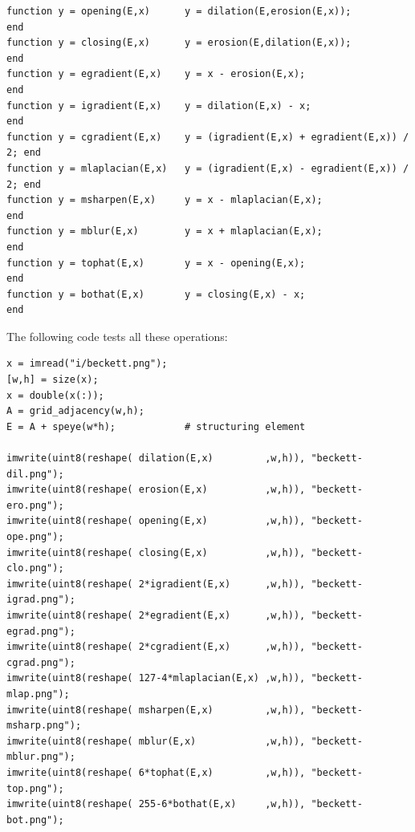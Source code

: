 \begin{verbatim}
function y = opening(E,x)      y = dilation(E,erosion(E,x));              end
function y = closing(E,x)      y = erosion(E,dilation(E,x));              end
function y = egradient(E,x)    y = x - erosion(E,x);                      end
function y = igradient(E,x)    y = dilation(E,x) - x;                     end
function y = cgradient(E,x)    y = (igradient(E,x) + egradient(E,x)) / 2; end
function y = mlaplacian(E,x)   y = (igradient(E,x) - egradient(E,x)) / 2; end
function y = msharpen(E,x)     y = x - mlaplacian(E,x);                   end
function y = mblur(E,x)        y = x + mlaplacian(E,x);                   end
function y = tophat(E,x)       y = x - opening(E,x);                      end
function y = bothat(E,x)       y = closing(E,x) - x;                      end
\end{verbatim}

The following code tests all these operations:

\begin{verbatim}
x = imread("i/beckett.png");
[w,h] = size(x);
x = double(x(:));
A = grid_adjacency(w,h);
E = A + speye(w*h);            # structuring element

imwrite(uint8(reshape( dilation(E,x)         ,w,h)), "beckett-dil.png");
imwrite(uint8(reshape( erosion(E,x)          ,w,h)), "beckett-ero.png");
imwrite(uint8(reshape( opening(E,x)          ,w,h)), "beckett-ope.png");
imwrite(uint8(reshape( closing(E,x)          ,w,h)), "beckett-clo.png");
imwrite(uint8(reshape( 2*igradient(E,x)      ,w,h)), "beckett-igrad.png");
imwrite(uint8(reshape( 2*egradient(E,x)      ,w,h)), "beckett-egrad.png");
imwrite(uint8(reshape( 2*cgradient(E,x)      ,w,h)), "beckett-cgrad.png");
imwrite(uint8(reshape( 127-4*mlaplacian(E,x) ,w,h)), "beckett-mlap.png");
imwrite(uint8(reshape( msharpen(E,x)         ,w,h)), "beckett-msharp.png");
imwrite(uint8(reshape( mblur(E,x)            ,w,h)), "beckett-mblur.png");
imwrite(uint8(reshape( 6*tophat(E,x)         ,w,h)), "beckett-top.png");
imwrite(uint8(reshape( 255-6*bothat(E,x)     ,w,h)), "beckett-bot.png");
\end{verbatim}

\begin{gallery}
\end{gallery}


